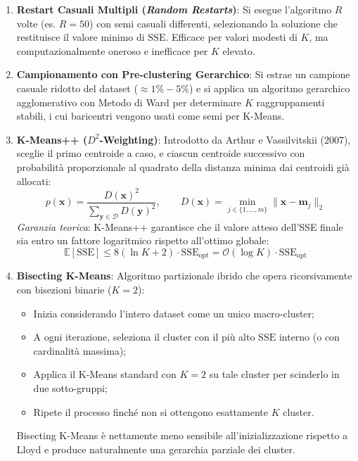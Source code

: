 \begin{enumerate}
    \item \textbf{Restart Casuali Multipli (\textit{Random Restarts})}: Si esegue l'algoritmo $R$ volte (es. $R = 50$) con semi casuali differenti, selezionando la soluzione che restituisce il valore minimo di $\mathrm{SSE}$. Efficace per valori modesti di $K$, ma computazionalmente oneroso e inefficace per $K$ elevato.
    \item \textbf{Campionamento con Pre-clustering Gerarchico}: Si estrae un campione casuale ridotto del dataset ($\approx 1\% - 5\%$) e si applica un algoritmo gerarchico agglomerativo con Metodo di Ward per determinare $K$ raggruppamenti stabili, i cui baricentri vengono usati come semi per K-Means.
    \item \textbf{K-Means++ ($D^2$-Weighting)}: Introdotto da Arthur e Vassilvitskii (2007), sceglie il primo centroide a caso, e ciascun centroide successivo con probabilità proporzionale al quadrato della distanza minima dai centroidi già allocati:
    \begin{equation}
        p(\mathbf{x}) = \frac{D(\mathbf{x})^2}{\sum_{\mathbf{y} \in \mathcal{D}} D(\mathbf{y})^2}, \qquad D(\mathbf{x}) = \min_{j \in \{1, \dots, m\}} \|\mathbf{x} - \mathbf{m}_j\|_2
    \end{equation}
    \textit{Garanzia teorica}: K-Means++ garantisce che il valore atteso dell'SSE finale sia entro un fattore logaritmico rispetto all'ottimo globale:
    \begin{equation}
        \mathbb{E}[\mathrm{SSE}] \le 8(\ln K + 2) \cdot \mathrm{SSE}_{\text{opt}} = \mathcal{O}(\log K) \cdot \mathrm{SSE}_{\text{opt}}
    \end{equation}
    \item \textbf{Bisecting K-Means}: Algoritmo partizionale ibrido che opera ricorsivamente con bisezioni binarie ($K=2$):
    \begin{itemize}[noitemsep]
        \item Inizia considerando l'intero dataset come un unico macro-cluster;
        \item A ogni iterazione, seleziona il cluster con il più alto $\mathrm{SSE}$ interno (o con cardinalità massima);
        \item Applica il K-Means standard con $K=2$ su tale cluster per scinderlo in due sotto-gruppi;
        \item Ripete il processo finché non si ottengono esattamente $K$ cluster.
    \end{itemize}
    Bisecting K-Means è nettamente meno sensibile all'inizializzazione rispetto a Lloyd e produce naturalmente una gerarchia parziale dei cluster.
\end{enumerate}


